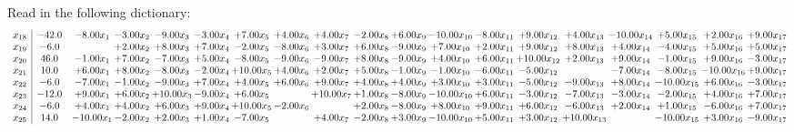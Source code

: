 \documentclass[9pt]{article}
\begin{document}
Read in the following dictionary:
\[\begin{array}{c| c c@{\hskip 2pt} c@{\hskip 2pt} c@{\hskip 2pt} c@{\hskip 2pt} c@{\hskip 2pt} c@{\hskip 2pt} c@{\hskip 2pt} c@{\hskip 2pt} c@{\hskip 2pt} c@{\hskip 2pt} c@{\hskip 2pt} c@{\hskip 2pt} c@{\hskip 2pt} c@{\hskip 2pt} c@{\hskip 2pt} c@{\hskip 2pt} c@{\hskip 2pt} }
 x_{18}   &  -42.0 & -8.00 x_{1} & -3.00 x_{2} & -9.00 x_{3} & -3.00 x_{4} & +  7.00 x_{5} & +  4.00 x_{6} & +  4.00 x_{7} & -2.00 x_{8} & +  6.00 x_{9} & -10.00 x_{10} & -8.00 x_{11} & +  9.00 x_{12} & +  4.00 x_{13} & -10.00 x_{14} & +  5.00 x_{15} & +  2.00 x_{16} & +  9.00 x_{17}\\
 x_{19}   &  -6.0  &   & +  2.00 x_{2} & +  8.00 x_{3} & +  7.00 x_{4} & -2.00 x_{5} & -8.00 x_{6} & +  3.00 x_{7} & +  6.00 x_{8} & -9.00 x_{9} & +  7.00 x_{10} & +  2.00 x_{11} & +  9.00 x_{12} & +  8.00 x_{13} & +  4.00 x_{14} & -4.00 x_{15} & +  5.00 x_{16} & +  5.00 x_{17}\\
 x_{20}   &  46.0 & -1.00 x_{1} & +  7.00 x_{2} & -7.00 x_{3} & +  5.00 x_{4} & -8.00 x_{5} & -9.00 x_{6} & -9.00 x_{7} & +  8.00 x_{8} & -9.00 x_{9} & +  4.00 x_{10} & +  6.00 x_{11} & + 10.00 x_{12} & +  2.00 x_{13} & +  9.00 x_{14} & -1.00 x_{15} & +  9.00 x_{16} & -3.00 x_{17}\\
 x_{21}   &  10.0 & +  6.00 x_{1} & +  8.00 x_{2} & -8.00 x_{3} & -2.00 x_{4} & + 10.00 x_{5} & +  4.00 x_{6} & +  2.00 x_{7} & +  5.00 x_{8} & -1.00 x_{9} & -1.00 x_{10} & -6.00 x_{11} & -5.00 x_{12} &   & -7.00 x_{14} & -8.00 x_{15} & -10.00 x_{16} & +  9.00 x_{17}\\
 x_{22}   &  -6.0 & -7.00 x_{1} & -1.00 x_{2} & -9.00 x_{3} & +  7.00 x_{4} & +  4.00 x_{5} & +  6.00 x_{6} & +  9.00 x_{7} & +  4.00 x_{8} & +  4.00 x_{9} & +  3.00 x_{10} & +  3.00 x_{11} & -5.00 x_{12} & -9.00 x_{13} & +  8.00 x_{14} & -10.00 x_{15} & +  6.00 x_{16} & -3.00 x_{17}\\
 x_{23}   &  -12.0 & +  9.00 x_{1} & +  6.00 x_{2} & + 10.00 x_{3} & -9.00 x_{4} & +  6.00 x_{5} &   & + 10.00 x_{7} & +  1.00 x_{8} & -8.00 x_{9} & -10.00 x_{10} & +  6.00 x_{11} & -3.00 x_{12} & -7.00 x_{13} & -3.00 x_{14} & -2.00 x_{15} & +  4.00 x_{16} & +  7.00 x_{17}\\
 x_{24}   &  -6.0 & +  4.00 x_{1} & +  4.00 x_{2} & +  6.00 x_{3} & +  9.00 x_{4} & + 10.00 x_{5} & -2.00 x_{6} &   & +  2.00 x_{8} & -8.00 x_{9} & +  8.00 x_{10} & +  9.00 x_{11} & +  6.00 x_{12} & -6.00 x_{13} & +  2.00 x_{14} & +  1.00 x_{15} & -6.00 x_{16} & +  7.00 x_{17}\\
 x_{25}   &  14.0 & -10.00 x_{1} & -2.00 x_{2} & +  2.00 x_{3} & +  1.00 x_{4} & -7.00 x_{5} &   & +  4.00 x_{7} & -2.00 x_{8} & +  3.00 x_{9} & -10.00 x_{10} & +  5.00 x_{11} & +  3.00 x_{12} & + 10.00 x_{13} &   & -10.00 x_{15} & +  3.00 x_{16} & -9.00 x_{17}\\

\end{array}\]
\end{document}
